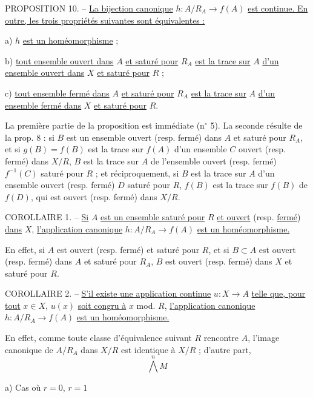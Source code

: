 PROPOSITION 10. -- \uline{La bijection canonique} $h:A/R_A\to f(A)$ \uline{est continue. En outre, les trois propriétés suivantes sont équivalentes :}

a) $h$ \uline{est un homéomorphisme} ;

b) \uline{tout ensemble ouvert dans} $A$ \uline{et saturé pour} $R_A$ \uline{est la trace sur} $A$ \uline{d'un ensemble ouvert dans} $X$ \uline{et saturé pour} $R$ ;

c) \uline{tout ensemble fermé dans} $A$ \uline{et saturé pour} $R_A$ \uline{est la trace sur} $A$ \uline{d'un ensemble fermé dans} $X$ \uline{et saturé pour} $R$.

La première partie de la proposition est immédiate (n$^{\circ}$ 5). La seconde résulte de la prop. 8 : si $B$ est un ensemble ouvert (resp. fermé) dans $A$ et saturé pour $R_A$, et si $g(B)=f(B)$ est la trace sur $f(A)$ d'un ensemble $C$ ouvert (resp. fermé) dans $X/R$, $B$ est la trace sur $A$ de l'ensemble ouvert (resp. fermé) $f^{-1}(C)$ saturé pour $R$ ; et réciproquement, si $B$ est la trace sur $A$ d'un ensemble ouvert (resp. fermé) $D$ saturé pour $R$, $f(B)$ est la trace sur $f(B)$ de $f(D)$, qui est ouvert (resp. fermé) dans $X/R$.

COROLLAIRE 1. -- \uline{Si} $A$ \uline{est un ensemble saturé pour} $R$ \uline{et ouvert} (resp. \uline{fermé}) \uline{dans} $X$, \uline{l'application canonique} $h:A/R_A\to f(A)$ \uline{est un homéomorphisme.}

En effet, si $A$ est ouvert (resp. fermé) et saturé pour $R$, et si $B\subset A$ est ouvert (resp. fermé) dans $A$ et saturé pour $R_A$, $B$ est ouvert (resp. fermé) dans $X$ et saturé pour $R$.

COROLLAIRE 2. -- \uline{S'il existe une application continue} $u:X\to A$ \uline{telle que, pour tout} $x\in X$, $u(x)$ \uline{soit congru à} $x$ mod. $R$, \uline{l'application canonique} $h:A/R_A\to f(A)$ \uline{est un homéomorphisme.}

En effet, comme toute classe d'équivalence suivant $R$ rencontre $A$, l'image canonique de $A/R_A$ dans $X/R$ est identique à $X/R$ ; d'autre part,
\[\bigwedge^n M\]

a) Cas où $r=0$, $r=1$

